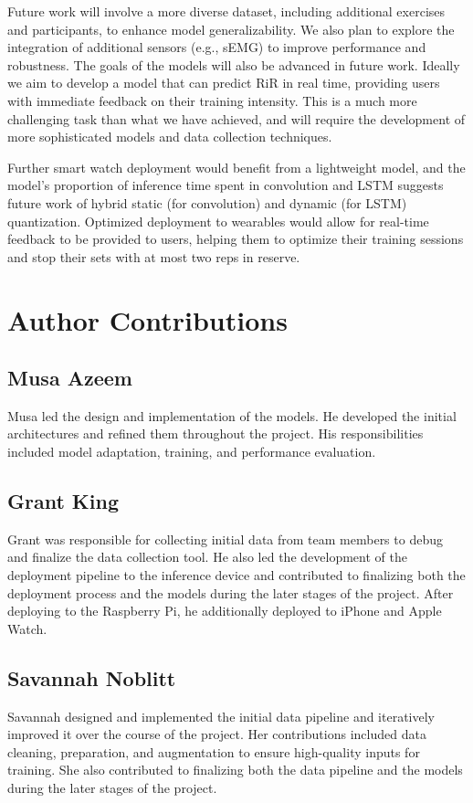 \documentclass[conference]{IEEEtran}
\begin{document}
Future work will involve a more diverse dataset, including additional exercises and participants, to enhance model generalizability. We also plan to explore the integration of additional sensors (e.g., sEMG) to improve performance and robustness. The goals of the models will also be advanced in future work. Ideally we aim to develop a model that can predict RiR in real time, providing users with immediate feedback on their training intensity. This is a much more challenging task than what we have achieved, and will require the development of more sophisticated models and data collection techniques.

Further smart watch deployment would benefit from a lightweight model, and the model's proportion of inference time spent in convolution and LSTM suggests future work of hybrid static (for convolution) and dynamic (for LSTM) quantization. Optimized deployment to wearables would allow for real-time feedback to be provided to users, helping them to optimize their training sessions and stop their sets with at most two reps in reserve.

\section{Author Contributions}

\subsection{Musa Azeem}
Musa led the design and implementation of the models. He developed the initial architectures and refined them throughout the project. His responsibilities included model adaptation, training, and performance evaluation.

\subsection{Grant King}
Grant was responsible for collecting initial data from team members to debug and finalize the data collection tool. He also led the development of the deployment pipeline to the inference device and contributed to finalizing both the deployment process and the models during the later stages of the project. After deploying to the Raspberry Pi, he additionally deployed to iPhone and Apple Watch.

\subsection{Savannah Noblitt}
Savannah designed and implemented the initial data pipeline and iteratively improved it over the course of the project. Her contributions included data cleaning, preparation, and augmentation to ensure high-quality inputs for training. She also contributed to finalizing both the data pipeline and the models during the later stages of the project.



\end{document}
